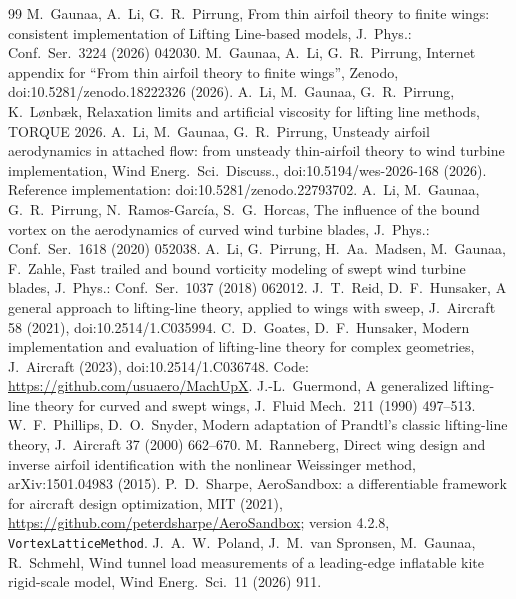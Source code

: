 \documentclass[11pt,a4paper]{article}
\begin{document}
\begin{thebibliography}{99}\small
{} M.~Gaunaa, A.~Li, G.~R.~Pirrung, From thin airfoil theory to finite wings: consistent implementation of Lifting Line-based models, J.\ Phys.: Conf.\ Ser.\ 3224 (2026) 042030.
 M.~Gaunaa, A.~Li, G.~R.~Pirrung, Internet appendix for ``From thin airfoil theory to finite wings'', Zenodo, doi:10.5281/zenodo.18222326 (2026).
 A.~Li, M.~Gaunaa, G.~R.~Pirrung, K.~L{\o}nb{\ae}k, Relaxation limits and artificial viscosity for lifting line methods, TORQUE 2026.
 A.~Li, M.~Gaunaa, G.~R.~Pirrung, Unsteady airfoil aerodynamics in attached flow: from unsteady thin-airfoil theory to wind turbine implementation, Wind Energ.\ Sci.\ Discuss., doi:10.5194/wes-2026-168 (2026). Reference implementation: doi:10.5281/zenodo.22793702.
 A.~Li, M.~Gaunaa, G.~R.~Pirrung, N.~Ramos-Garc\'ia, S.~G.~Horcas, The influence of the bound vortex on the aerodynamics of curved wind turbine blades, J.\ Phys.: Conf.\ Ser.\ 1618 (2020) 052038.
 A.~Li, G.~Pirrung, H.~Aa.~Madsen, M.~Gaunaa, F.~Zahle, Fast trailed and bound vorticity modeling of swept wind turbine blades, J.\ Phys.: Conf.\ Ser.\ 1037 (2018) 062012.
 J.~T.~Reid, D.~F.~Hunsaker, A general approach to lifting-line theory, applied to wings with sweep, J.\ Aircraft 58 (2021), doi:10.2514/1.C035994.
 C.~D.~Goates, D.~F.~Hunsaker, Modern implementation and evaluation of lifting-line theory for complex geometries, J.\ Aircraft (2023), doi:10.2514/1.C036748. Code: \url{https://github.com/usuaero/MachUpX}.
 J.-L.~Guermond, A generalized lifting-line theory for curved and swept wings, J.\ Fluid Mech.\ 211 (1990) 497--513.
 W.~F.~Phillips, D.~O.~Snyder, Modern adaptation of Prandtl's classic lifting-line theory, J.\ Aircraft 37 (2000) 662--670.
 M.~Ranneberg, Direct wing design and inverse airfoil identification with the nonlinear Weissinger method, arXiv:1501.04983 (2015).
 P.~D.~Sharpe, AeroSandbox: a differentiable framework for aircraft design optimization, MIT (2021), \url{https://github.com/peterdsharpe/AeroSandbox}; version 4.2.8, \texttt{VortexLatticeMethod}.
 J.~A.~W.~Poland, J.~M.~van Spronsen, M.~Gaunaa, R.~Schmehl, Wind tunnel load measurements of a leading-edge inflatable kite rigid-scale model, Wind Energ.\ Sci.\ 11 (2026) 911.
\end{thebibliography}
\end{document}
